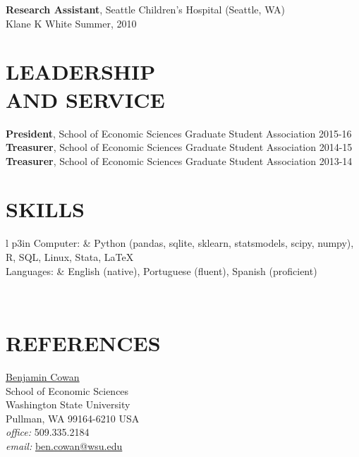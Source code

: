 \documentclass[margin]{res}  %
\begin{document}
\begin{resume}
\textbf{Research Assistant}, Seattle Children's Hospital (Seattle, WA) \\
Klane K White \hfill Summer, 2010



\section{\textnormal{LEADERSHIP\\ AND SERVICE}} 
  
\textbf{President}, School of Economic Sciences Graduate Student Association \hfill 2015-16\\
\textbf{Treasurer}, School of Economic Sciences Graduate Student Association \hfill 2014-15\\
\textbf{Treasurer}, School of Economic Sciences Graduate Student Association \hfill 2013-14\\

\section{\textnormal{SKILLS}}
   \begin{tabular}{l p{3in}}
       Computer: &  Python (pandas, sqlite, sklearn, statsmodels, scipy, numpy), R, SQL, Linux, Stata, \LaTeX \\[12pt]
        Languages: & English (native), Portuguese (fluent), Spanish (proficient)
 \end{tabular}
\\

\newpage
\section{\textnormal{REFERENCES}}
\begin{table}[ht] %
\begin{minipage}[t]{0.5\linewidth} %
\vspace{2em}
\href{http://people.ses.wsu.edu/Cowan/}{\underline{Benjamin Cowan}}\\
School of Economic Sciences\\
Washington State University\\
Pullman, WA 99164-6210 USA\\
\emph{office:} 509.335.2184\\
\emph{email:} \href{mailto:ben.cowan@wsu.edu}{ben.cowan@wsu.edu}\\


\end{minipage}
\end{table}
\end{resume}
\end{document}
